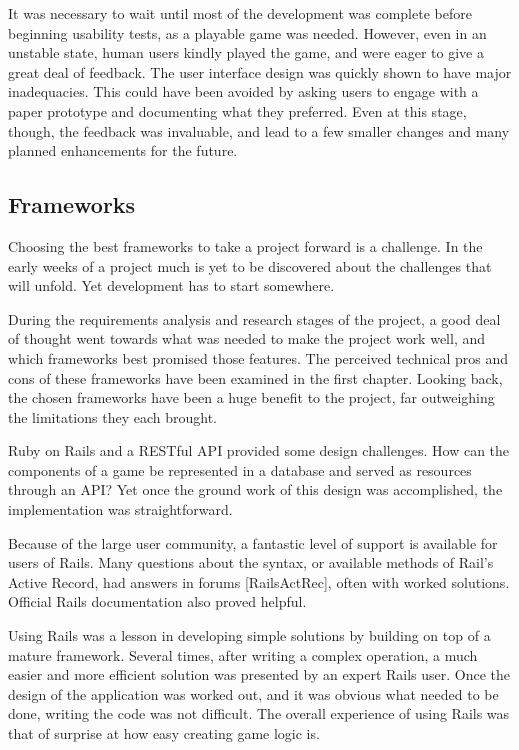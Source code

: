 It was necessary to wait until most of the development was complete before beginning usability tests, as a playable game was needed. However, even in an unstable state, human users kindly played the game, and were eager to give a great deal of feedback. The user interface design was quickly shown to have major inadequacies. This could have been avoided by asking users to engage with a paper prototype and documenting what they preferred. Even at this stage, though, the feedback was invaluable, and lead to a few smaller changes and many planned enhancements for the future.

\subsection{Frameworks}
Choosing the best frameworks to take a project forward is a challenge. In the early weeks of a project much is yet to be discovered about the challenges that will unfold. Yet development has to start somewhere.

During the requirements analysis and research stages of the project, a good deal of thought went towards what was needed to make the project work well, and which frameworks best promised  those features. The perceived technical pros and cons of these frameworks have been examined in the first chapter. Looking back, the chosen frameworks have been a huge benefit to the project, far outweighing the limitations they each brought.

Ruby on Rails and a RESTful API provided some design challenges. How can the components of a game be represented in a database and served as resources through an API? Yet once the ground work of this design was accomplished, the implementation was straightforward. 

Because of the large user community, a fantastic level of support is available for users of Rails. Many questions about the syntax, or available methods of Rail's Active Record, had answers in forums [RailsActRec], often with worked solutions. Official Rails documentation \cite{RailsDocs} also proved helpful. 

Using Rails was a lesson in developing simple solutions by building on top of a mature framework. Several times, after writing a complex operation, a much easier and more efficient solution was presented by an expert Rails user. Once the design of the application was worked out, and it was obvious what needed to be done, writing the code was not difficult. The overall experience of using Rails was that of surprise at how easy creating game logic is.

